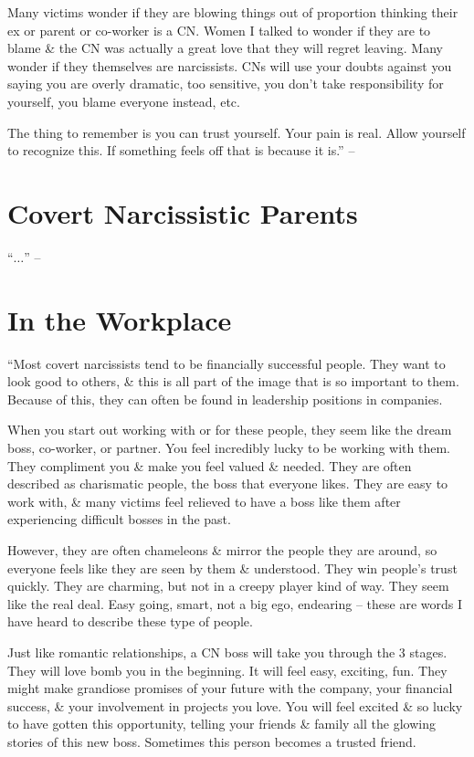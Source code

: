 \documentclass{article}
\numberwithin{equation}{section}
\begin{document}
Many victims wonder if they are blowing things out of proportion thinking their ex or parent or co-worker is a CN. Women I talked to wonder if they are to blame \& the CN was actually a great love that they will regret leaving. Many wonder if they themselves are narcissists. CNs will use your doubts against you saying you are overly dramatic, too sensitive, you don't take responsibility for yourself, you blame everyone instead, etc.

The thing to remember is you can trust yourself. Your pain is real. Allow yourself to recognize this. If something feels off that is because it is.'' -- \cite[pp. 88--89]{Mirza2017}


\section{Covert Narcissistic Parents}
``$\ldots$'' -- \cite[pp. 90--99]{Mirza2017}


\section{In the Workplace}
``Most covert narcissists tend to be financially successful people. They want to look good to others, \& this is all part of the image that is so important to them. Because of this, they can often be found in leadership positions in companies.

When you start out working with or for these people, they seem like the dream boss, co-worker, or partner. You feel incredibly lucky to be working with them. They compliment you \& make you feel valued \& needed. They are often described as charismatic people, the boss that everyone likes. They are easy to work with, \& many victims feel relieved to have a boss like them after experiencing difficult bosses in the past.

However, they are often chameleons \& mirror the people they are around, so everyone feels like they are seen by them \& understood. They win people's trust quickly. They are charming, but not in a creepy player kind of way. They seem like the real deal. Easy going, smart, not a big ego, endearing -- these are words I have heard to describe these type of people.

Just like romantic relationships, a CN boss will take you through the 3 stages. They will love bomb you in the beginning. It will feel easy, exciting, fun. They might make grandiose promises of your future with the company, your financial success, \& your involvement in projects you love. You will feel excited \& so lucky to have gotten this opportunity, telling your friends \& family all the glowing stories of this new boss. Sometimes this person becomes a trusted friend.
\end{document}
